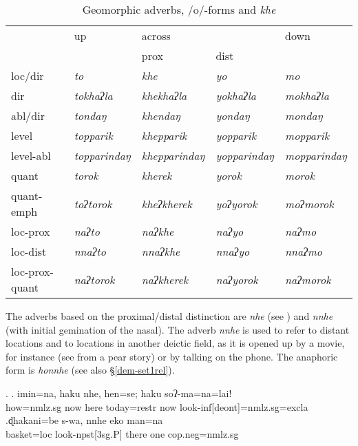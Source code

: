  \begin{table}[htp]
\begin{centering}
\begin{tabular}{lllll}
\toprule
									&{\sc up}		&\multicolumn{2}{l}{{\sc across}}&{\sc down}\\
											&				&{\sc prox}&{\sc dist}&\\
\midrule 	  
			{\sc loc/dir}	&\emph{to}&\emph{khe}&\emph{yo}&\emph{mo}\\
			{\sc dir} 				&\emph{tokhaʔla}&\emph{khekhaʔla}&\emph{yokhaʔla}&\emph{mokhaʔla}\\
			{\sc abl/dir}											&\emph{tondaŋ}&\emph{khendaŋ}&\emph{yondaŋ}&\emph{mondaŋ}\\
			{\sc level}											&\emph{topparik}&\emph{khepparik}&\emph{yopparik}&\emph{mopparik}\\
			{\sc level-abl}									&\emph{topparindaŋ}&\emph{khepparindaŋ}&\emph{yopparindaŋ}&\emph{mopparindaŋ}\\
			{\sc quant} 					&\emph{torok}&\emph{kherek}&\emph{yorok}&\emph{morok}\\
			{\sc quant-emph}								&\emph{toʔtorok}&\emph{kheʔkherek}&\emph{yoʔyorok}&\emph{moʔmorok}\\
			{\sc loc-prox}									&\emph{naʔto}&\emph{naʔkhe}&\emph{naʔyo}&\emph{naʔmo}\\
			{\sc loc-dist}										&\emph{nnaʔto}&\emph{nnaʔkhe}&\emph{nnaʔyo}&\emph{nnaʔmo}\\
			{\sc loc-prox-quant}					&\emph{naʔtorok}&\emph{naʔkherek}&\emph{naʔyorok}&\emph{naʔmorok}\\
\bottomrule
\end{tabular} 
\caption{Geomorphic adverbs, /o/-forms and \emph{khe}}\label{deic-all2}
\end{centering}
\end{table}


The adverbs based on the proximal/distal distinction are \emph{nhe}  (see \Next[a]) and \emph{nnhe}  (with initial gemination of the nasal). The adverb \emph{nnhe} is used to refer to distant locations and to locations in another deictic field, as it is opened up by a movie, for instance  (see \Next[b] from a pear story) or by talking on the phone. The anaphoric form is \emph{honnhe}  (see also §\ref{dem-set1rel}). 

\ex. \ag. imin=na,       haku nhe, hen=se;         haku soʔ-ma=na=lai!\\
how{\sc =nmlz.sg}  now here today{\sc =restr} now look{\sc -inf[deont]=nmlz.sg=excla}\\
  
\bg.ɖhakani=be    s-wa,         nnhe  eko man=na \\
basket{\sc =loc} look{\sc -npst[3sg.P]} there one {\sc cop.neg=nmlz.sg}\\
 


